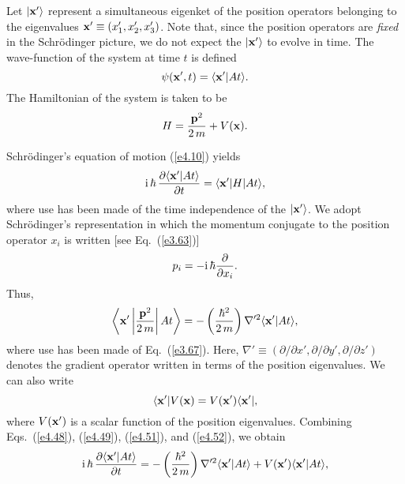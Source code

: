 Let $|{\bf x'}\rangle$ represent a simultaneous eigenket of the position operators
belonging to the eigenvalues ${\bf x'} \equiv (x_1', x_2', x_3')$. Note that, since
the position operators  are {\em fixed} in the Schr\"{o}dinger picture, we do not
expect the $|{\bf x}'\rangle$ to evolve in time. The wave-function of the system
at time $t$ is defined
\begin{equation}
\psi({\bf x'}, t) = \langle {\bf x'}| At\rangle.
\end{equation}
The Hamiltonian of the system is taken to be
\begin{equation}\label{e4.48}
H = \frac{{\bf p}^2}{2\,m} + V({\bf x}).
\end{equation}

Schr\"{o}dinger's equation of motion (\ref{e4.10}) yields 
\begin{equation}\label{e4.49}
{\rm i}\,\hbar \,\frac{\partial \langle {\bf x'}|At\rangle}{\partial t}
= \langle {\bf x'}|H| At\rangle,
\end{equation}
where use has been made of the time independence of the $|{\bf x'}\rangle$. 
We adopt Schr\"{o}d\-inger's representation in which the momentum conjugate
to the position operator $x_i$ is written  [see Eq.~(\ref{e3.63})]
\begin{equation}\label{e4.50}
p_i = -{\rm i}\,\hbar\frac{\partial}{\partial x_i}.
\end{equation}
Thus,
\begin{equation}\label{e4.51}
\left\langle {\bf x}'\left|\frac{{\bf p}^2}{2\,m}\right| At\right\rangle = 
- \left(\frac{\hbar^2}{2\,m}\right)
\nabla'^2\langle {\bf x'} |At\rangle,
\end{equation}
where use has been made of Eq.~(\ref{e3.67}). Here, $\nabla'\equiv(\partial/\partial x',
\partial/\partial y', \partial/\partial z')$ denotes the gradient operator written
in terms of the position eigenvalues. We can also
write
\begin{equation}\label{e4.52}
\langle {\bf x'}|V({\bf x}) = V({\bf x'})\langle {\bf x'} |,
\end{equation}
where $V({\bf x'})$ is  a scalar function of the position eigenvalues. Combining
Eqs.~(\ref{e4.48}), (\ref{e4.49}), (\ref{e4.51}), and (\ref{e4.52}), we obtain
\begin{equation}
{\rm i}\,\hbar \,\frac{\partial \langle {\bf x}'|At\rangle}{\partial t}
= - \left(\frac{\hbar^2}{2\,m}\right)
\nabla'^2\langle{\bf x'} |At\rangle + V({\bf x}') \langle {\bf x}'|At\rangle,
\end{equation}
